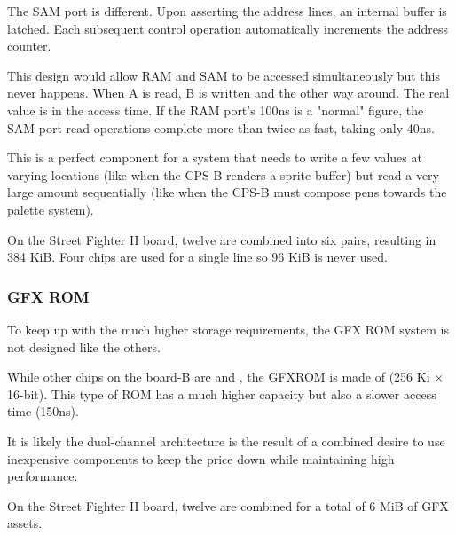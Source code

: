 The SAM port is different. Upon asserting the address lines, an internal buffer is latched. Each subsequent control operation automatically increments the address counter.

This design would allow RAM and SAM to be accessed simultaneously but this never happens. When A is read, B is written and the other way around. The real value is in the access time. If the RAM port's 100ns is a "normal" figure, the SAM port read operations complete more than twice as fast, taking only 40ns. 

 This is a perfect component for a system that needs to write a few values at varying locations (like when the CPS-B renders a sprite buffer) but read a very large amount sequentially (like when the CPS-B must compose pens towards the palette system).

 On the Street Fighter II board, twelve  are combined into six pairs, resulting in 384 KiB. Four chips are used for a single line so 96 KiB is never used.







\subsubsection{GFX ROM}
To keep up with the much higher storage requirements, the GFX ROM system is not designed like the others. 

While other chips on the board-B are  and , the GFXROM is made of  (256 Ki $\times$ 16-bit). This type of ROM has a much higher capacity but also a slower access time (150ns).

It is likely the dual-channel architecture is the result of a combined desire to use inexpensive components to keep the price down while maintaining high performance.



On the Street Fighter II board, twelve  are combined for a total of 6 MiB of GFX assets.

